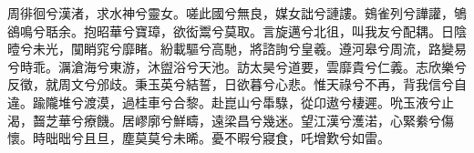 
\begin{pinyinscope}
周徘徊兮漢渚，求水神兮靈女。嗟此國兮無良，媒女詘兮謰謱。鴳雀列兮譁讙，鴝鵒鳴兮聒余。抱昭華兮寶璋，欲衒鬻兮莫取。言旋邁兮北徂，叫我友兮配耦。日陰曀兮未光，闃睄窕兮靡睹。紛載驅兮高馳，將諮詢兮皇羲。遵河皋兮周流，路變易兮時乖。濿滄海兮東游，沐盥浴兮天池。訪太昊兮道要，雲靡貴兮仁義。志欣樂兮反徵，就周文兮邠歧。秉玉英兮結誓，日欲暮兮心悲。惟天祿兮不再，背我信兮自違。踰隴堆兮渡漠，過桂車兮合黎。赴崑山兮馽騄，從卬遨兮棲遲。吮玉液兮止渴，齧芝華兮療饑。居嵺廓兮鮮疇，遠梁昌兮幾迷。望江漢兮濩渃，心緊絭兮傷懷。時昢昢兮且旦，塵莫莫兮未晞。憂不暇兮寢食，吒增歎兮如雷。


\end{pinyinscope}